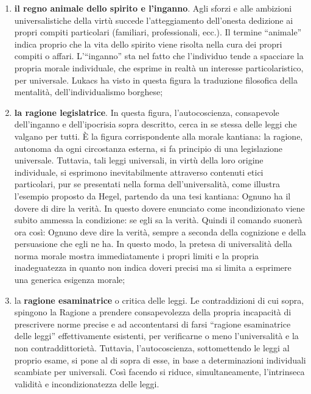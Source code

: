 \documentclass[a4paper,12pt,oneside,openany]{book}%
\begin{document}
\begin{enumerate}
	\item \textbf{il regno animale dello spirito e l’inganno}. Agli sforzi e alle ambizioni universalistiche della virtù succede l’atteggiamento dell’onesta dedizione ai propri compiti particolari (familiari, professionali, ecc.). Il termine “animale” indica proprio che la vita dello spirito viene risolta nella cura dei propri compiti o affari. L’“inganno” sta nel fatto che l’individuo tende a spacciare la propria morale individuale, che esprime in realtà un interesse particolaristico, per universale. Lukacs ha visto in questa figura la traduzione filosofica della mentalità, dell’individualismo borghese;
	\item \textbf{la ragione legislatrice}. In questa figura, l’autocoscienza, consapevole dell’inganno e dell’ipocrisia sopra descritto, cerca in se stessa delle leggi che valgano per tutti. È la figura corrispondente alla morale kantiana: la ragione, autonoma da ogni circostanza esterna, si fa principio di una legislazione universale. Tuttavia, tali leggi universali, in virtù della loro origine individuale, si esprimono inevitabilmente attraverso contenuti etici particolari, pur se presentati nella forma dell’universalità, come illustra l’esempio proposto da Hegel, partendo da una tesi kantiana: Ognuno ha il dovere di dire la verità. In questo dovere enunciato come incondizionato viene subito ammessa la condizione: se egli sa la verità. Quindi il comando suonerà ora così: Ognuno deve dire la verità, sempre a seconda della cognizione e della persuasione che egli ne ha. In questo modo, la pretesa di universalità della norma morale mostra immediatamente i propri limiti e la propria inadeguatezza in quanto non indica doveri precisi ma si limita a esprimere una generica esigenza morale;
	
	\item la \textbf{ragione esaminatrice} o critica delle leggi. Le contraddizioni di cui sopra, spingono la Ragione a prendere consapevolezza della propria incapacità di prescrivere norme precise e ad accontentarsi di farsi “ragione esaminatrice delle leggi” effettivamente esistenti, per verificarne o meno l’universalità e la non contraddittorietà. Tuttavia, l’autocoscienza, sottomettendo le leggi al proprio esame, si pone al di sopra di esse, in base a determinazioni individuali scambiate per universali. Così facendo si riduce, simultaneamente, l’intrinseca validità e incondizionatezza delle leggi.
\end{enumerate}
\end{document}
